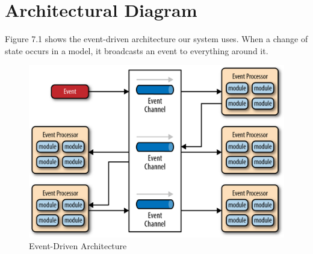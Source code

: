 \chapter{Architectural Diagram} %


Figure 7.1 shows the event-driven architecture our system uses. When a change of state occurs in a model, it broadcasts an event to everything around it.
\begin{figure}[ht]
    \centering
    \includegraphics[scale=1.5]{eventarchitecture.png}
    \caption{Event-Driven Architecture}
\end{figure}